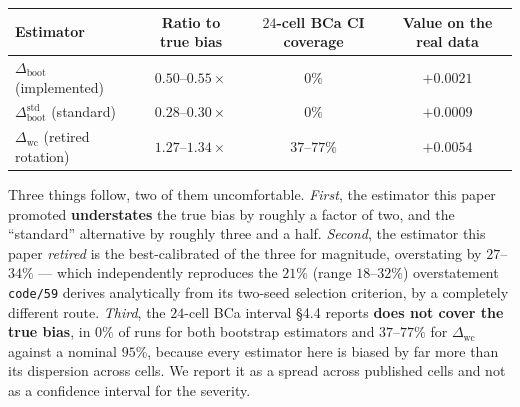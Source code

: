 \documentclass[10pt]{article} %
\begin{document}
\begin{center}\small
\begin{tabular}{lccc}
\toprule
Estimator & Ratio to true bias & $24$-cell BCa CI coverage & Value on the real data \\
\midrule
$\Delta_{\text{boot}}$ (implemented) & $0.50$--$0.55\times$ & $0\%$ & $+0.0021$ \\
$\Delta_{\text{boot}}^{\text{std}}$ (standard) & $0.28$--$0.30\times$ & $0\%$ & $+0.0009$ \\
$\Delta_{\text{wc}}$ (retired rotation) & $1.27$--$1.34\times$ & $37$--$77\%$ & $+0.0054$ \\
\bottomrule
\end{tabular}
\end{center}

\noindent Three things follow, two of them uncomfortable. \emph{First}, the
estimator this paper promoted \textbf{understates} the true bias by roughly a
factor of two, and the ``standard'' alternative by roughly three and a half.
\emph{Second}, the estimator this paper \emph{retired} is the best-calibrated
of the three for magnitude, overstating by $27$--$34\%$ --- which independently
reproduces the $21\%$ (range $18$--$32\%$) overstatement \texttt{code/59}
derives analytically from its two-seed selection criterion, by a completely
different route. \emph{Third}, the $24$-cell BCa interval §4.4 reports
\textbf{does not cover the true bias}, in $0\%$ of runs for both bootstrap
estimators and $37$--$77\%$ for $\Delta_{\text{wc}}$ against a nominal $95\%$,
because every estimator here is biased by far more than its dispersion across
cells. We report it as a spread across published cells and not as a confidence
interval for the severity.
\end{document}

